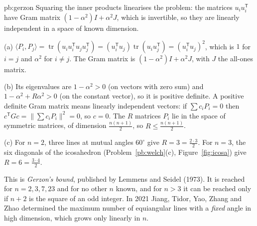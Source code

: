 \begin{solution}{pb:gerzon}
\idea Squaring the inner products linearises the problem: the matrices $u_iu_i^{\mathsf T}$ have Gram matrix $(1-\alpha^2)I+\alpha^2J$, which is invertible, so they are linearly independent in
a space of known dimension.

\writeup (a) $\langle P_i,P_j\rangle=\operatorname{tr}(u_iu_i^{\mathsf T}u_ju_j^{\mathsf T})=(u_i^{\mathsf T}u_j)\operatorname{tr}(u_iu_j^{\mathsf T})=(u_i^{\mathsf T}u_j)^2$, which is $1$ for $i=j$ and $\alpha^2$ for $i\ne j$. The Gram matrix
is $(1-\alpha^2)I+\alpha^2J$, with $J$ the all-ones matrix.

(b) Its eigenvalues are $1-\alpha^2>0$ (on vectors with zero sum) and $1-\alpha^2+R\alpha^2>0$ (on the constant vector), so it is positive definite. A positive definite Gram matrix means
linearly independent vectors: if $\sum c_iP_i=0$ then $c^{\mathsf T}Gc=\|\sum c_iP_i\|^2=0$, so $c=0$. The $R$ matrices $P_i$ lie in the space of symmetric matrices, of dimension
$\frac{n(n+1)}2$, so $R\le\frac{n(n+1)}2$.

(c) For $n=2$, three lines at mutual angles $60^\circ$ give $R=3=\frac{2\cdot3}2$. For $n=3$, the six diagonals of the icosahedron (Problem~\ref{pb:welch}(c), Figure~\ref{fig:icosa})
give $R=6=\frac{3\cdot4}2$.

\leads This is \emph{Gerzon's bound}, published by Lemmens and Seidel (1973). It is reached for $n=2,3,7,23$ and for no other $n$ known, and for $n>3$ it can be reached only if $n+2$ is the square
of an odd integer. In 2021 Jiang, Tidor, Yao, Zhang and Zhao determined the maximum number of equiangular lines
with a \emph{fixed} angle in high dimension, which grows only linearly in $n$.
\end{solution}

